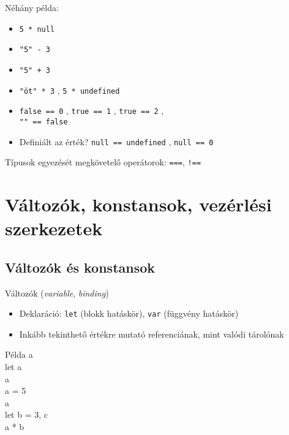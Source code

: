\documentclass[usenames,dvipsnames,aspectratio=169]{beamer}
\begin{document}
\begin{frame}
    Néhány példa:
    \begin{itemize}
        \item \texttt{5 * null} 
        \item \texttt{"5" - 3} 
        \item \texttt{"5" + 3} 
        \item \texttt{"öt" * 3} , \texttt{5 * undefined} 
        \item \texttt{false == 0} , \texttt{true == 1} , \texttt{true == 2} , \\ \texttt{"" == false} 
        \item Definiált az érték? \texttt{null == undefined} , \texttt{null == 0} 
    \end{itemize}
    \vfill
    Típusok egyezését megkövetelő operátorok: \texttt{===}, \texttt{!==}
\end{frame}

\section{Változók, konstansok, vezérlési szerkezetek}

\subsection{Változók és konstansok}

\begin{frame}
    Változók (\emph{variable}, \emph{binding})
    \begin{itemize}
        \item Deklaráció: \texttt{let} (blokk hatáskör), \texttt{var} (függvény hatáskör)
        \item Inkább tekinthető értékre mutató referenciának, mint valódi tárolónak
    \end{itemize}
    \begin{exampleblock}{Példa}
        a \\
        let a\\
        a \\
        a = 5\\
        a \\
        let b = 3, c\\
        a * b \\
    \end{exampleblock}
\end{frame}
\end{document}
